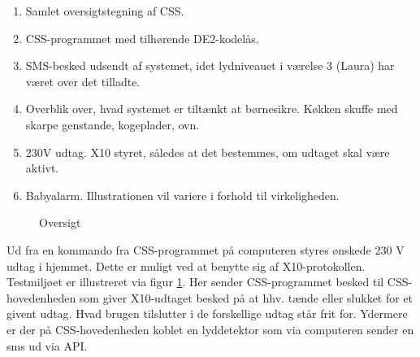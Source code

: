 \begin{enumerate}
\item Samlet oversigtstegning af CSS. 
\item CSS-programmet med tilhørende DE2-kodelås.
\item SMS-besked udsendt af systemet, idet lydniveauet i værelse 3 (Laura) har været over det tilladte.
\item Overblik over, hvad systemet er tiltænkt at børnesikre. Køkken skuffe med skarpe genstande, kogeplader, ovn.
\item 230V udtag. X10 styret, således at det bestemmes, om udtaget skal være aktivt.
\item Babyalarm. Illustrationen vil variere i forhold til virkeligheden.
\end{enumerate}

\begin{figure}[h] \centering
{}
\caption{Oversigt}
\label{fig:plan_oversigt}
\end{figure}


Ud fra en kommando fra CSS-programmet på computeren styres ønskede 230 V udtag i hjemmet. Dette er muligt ved at benytte sig af X10-protokollen. Testmiljøet er illustreret via figur \ref{fig:plan_oversigt}. Her sender CSS-programmet besked til CSS-hovedenheden som giver X10-udtaget besked på at hhv. tænde eller slukket for et givent udtag. Hvad brugen tilslutter i de forskellige udtag står frit for. Ydermere er der på CSS-hovedenheden koblet en lyddetektor som via computeren sender en sms ud via API.